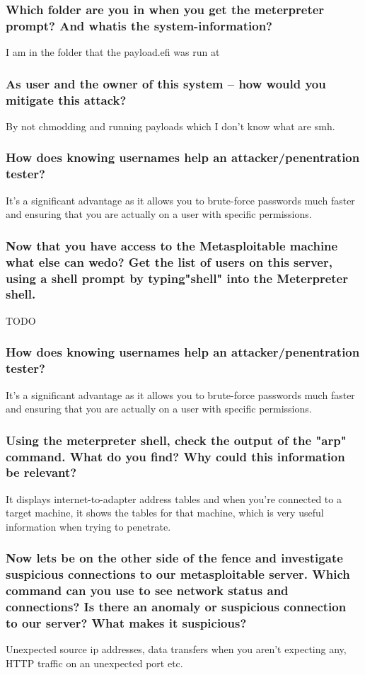 \subsubsection{Which folder are you in when you get the meterpreter prompt? And whatis the system-information?}
I am in the folder that the payload.efi was run at

\subsubsection{As user and the owner of this system -- how would you mitigate this attack?}
By not chmodding and running payloads which I don't know what are smh.

\subsubsection{How does knowing usernames help an attacker/penentration tester?
}
It's a significant advantage as it allows you to brute-force passwords much faster and ensuring that you are actually on a user with specific permissions.

\subsubsection{Now that you have access to the Metasploitable machine what else can wedo? Get the list of users on this server, using a shell prompt by typing"shell" into the Meterpreter shell.}
TODO

\subsubsection{How does knowing usernames help an attacker/penentration tester?}
It's a significant advantage as it allows you to brute-force passwords much faster and ensuring that you are actually on a user with specific permissions.

\subsubsection{Using the meterpreter shell, check the output of the "arp" command. What do you find? Why could this information be relevant?
}
It displays internet-to-adapter address tables and when you're connected to a target machine, it shows the tables for that machine, which is very useful information when trying to penetrate.

\subsubsection{Now lets be on the other side of the fence and investigate suspicious connections to our metasploitable server. Which command can you use to see network status and connections? Is there an anomaly or suspicious connection to our server? What makes it suspicious?}
Unexpected source ip addresses, data transfers when you aren't expecting any, HTTP traffic on an unexpected port etc.